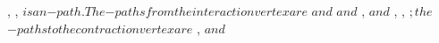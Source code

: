 \documentclass[a4paper]{LMCS}
\begin{document}
\begin{exa}
{{                                {\scriptstyle{}}
                                {\scriptscriptstyle{}}}},{{
                              {\scriptstyle{}}
                              {\scriptstyle{}}
                              {\scriptscriptstyle{}}}},{{
                              {\scriptstyle{}}
                              {\scriptstyle{}}
                              {\scriptscriptstyle{}}}}$ is an ${}$-path. The ${}$-paths from the interaction vertex are ${{
                              {\scriptstyle{}}
                              {\scriptstyle{}}
                              {\scriptscriptstyle{}}}}$ and ${{
                              {\scriptstyle{}}
                              {\scriptstyle{}}
                              {\scriptscriptstyle{}}}}$ and ${{
                              {\scriptstyle{}}
                              {\scriptstyle{}}
                              {\scriptscriptstyle{}}}},{{
                                {\scriptstyle{}}
                                {\scriptstyle{}}
                                {\scriptscriptstyle{}}}}$ and ${{
                              {\scriptstyle{}}
                              {\scriptstyle{}}
                              {\scriptscriptstyle{}}}},{{
                                {\scriptstyle{}}
                                {\scriptstyle{}}
                                {\scriptscriptstyle{}}}},{{
                                {\scriptstyle{}}
                                {\scriptstyle{}}
                                {\scriptscriptstyle{}}}}$; the ${}$-paths to the contraction vertex are ${{
                              {\scriptstyle{}}
                              {\scriptstyle{}}
                              {\scriptscriptstyle{}}}},{{
                              {\scriptstyle{}}
                              {\scriptstyle{}}
                              {\scriptscriptstyle{}}}}$ and ${{
                              {\scriptstyle{}}
}}
\end{exa}
\end{document}

